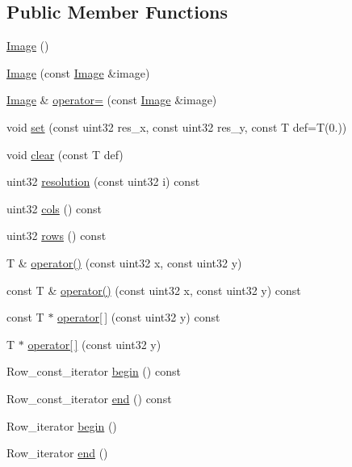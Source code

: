 \subsection*{\-Public \-Member \-Functions}
\begin{DoxyCompactItemize}
\item 
\hyperlink{classnih_1_1_image_a9c8b360b9c6c43d67a8ea5039910b730}{\-Image} ()
\item 
\hyperlink{classnih_1_1_image_a82643045a9ab3f076b33a311320da116}{\-Image} (const \hyperlink{classnih_1_1_image}{\-Image} \&image)
\item 
\hyperlink{classnih_1_1_image}{\-Image} \& \hyperlink{classnih_1_1_image_aa7485220a5eeb31401def6c3e72d48be}{operator=} (const \hyperlink{classnih_1_1_image}{\-Image} \&image)
\item 
void \hyperlink{classnih_1_1_image_ae9797fafa8e69882f19bfcb4f1227bba}{set} (const uint32 res\-\_\-x, const uint32 res\-\_\-y, const \-T def=\-T(0.))
\item 
void \hyperlink{classnih_1_1_image_ac8b325d9f7271215b974082b7639ec3f}{clear} (const \-T def)
\item 
uint32 \hyperlink{classnih_1_1_image_ab637ec6e7b92f39038c2e827961586c9}{resolution} (const uint32 i) const 
\item 
uint32 \hyperlink{classnih_1_1_image_a166ef231ddfb1d5fff0a6d174ec0d182}{cols} () const 
\item 
uint32 \hyperlink{classnih_1_1_image_a149bc73b02026b3c97e0e1bf8b7d2833}{rows} () const 
\item 
\-T \& \hyperlink{classnih_1_1_image_ab5f3462b149680faf6fec6c818408c0b}{operator()} (const uint32 x, const uint32 y)
\item 
const \-T \& \hyperlink{classnih_1_1_image_a1b6584cd7349186c6e6faca6856f77a5}{operator()} (const uint32 x, const uint32 y) const 
\item 
const \-T $\ast$ \hyperlink{classnih_1_1_image_a98250285c5f8a0e1ab672ae0ae453a54}{operator\mbox{[}$\,$\mbox{]}} (const uint32 y) const 
\item 
\-T $\ast$ \hyperlink{classnih_1_1_image_ac49ee0f27d5da14952e3ad890c8a6bda}{operator\mbox{[}$\,$\mbox{]}} (const uint32 y)
\item 
\-Row\-\_\-const\-\_\-iterator \hyperlink{classnih_1_1_image_affe9b98c67f1e4d27b6bfb0cbb4ed6c6}{begin} () const 
\item 
\-Row\-\_\-const\-\_\-iterator \hyperlink{classnih_1_1_image_a78c6027f77af6aa6f72dac6b84269ae7}{end} () const 
\item 
\-Row\-\_\-iterator \hyperlink{classnih_1_1_image_af5c16c3840bd5b706ebb1e3a546aabc8}{begin} ()
\item 
\-Row\-\_\-iterator \hyperlink{classnih_1_1_image_a12fa4f245c121a0634ffe963c3f1aefa}{end} ()
\end{DoxyCompactItemize}


